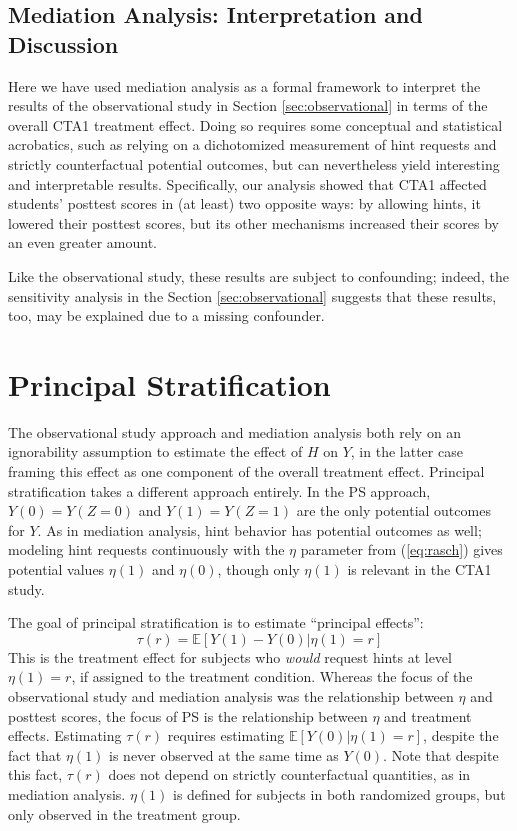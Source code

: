 \documentclass{article}
\newcommand{\EE}{\mathbb{E}}
\begin{document}
\subsection{Mediation Analysis: Interpretation and Discussion}
Here we have used mediation analysis as a formal framework to
interpret the results of the observational study in Section
\ref{sec:observational} in terms of the overall CTA1 treatment effect.
Doing so requires some conceptual and statistical acrobatics, such as
relying on a dichotomized measurement of hint requests and strictly
counterfactual potential outcomes, but can nevertheless yield
interesting and interpretable results.
Specifically, our analysis showed that CTA1 affected students'
posttest scores in (at least) two opposite ways: by allowing hints, it
lowered their posttest scores, but its other mechanisms increased
their scores by an even greater amount.

Like the observational study, these results are subject to
confounding; indeed, the sensitivity analysis in the Section
\ref{sec:observational} suggests that these results, too, may be
explained due to a missing confounder.



\section{Principal Stratification}\label{sec:principalStratification}
The observational study approach and mediation analysis both rely on
an ignorability assumption to estimate the effect of $H$ on $Y$, in
the latter case framing this effect as one component of the overall
treatment effect.
Principal stratification \citep[PS;][]{frangakis} takes a different approach entirely.
In the PS approach, $Y(0)=Y(Z=0)$ and $Y(1)=Y(Z=1)$ are the only potential
outcomes for $Y$.
As in mediation analysis, hint behavior has potential outcomes as
well; modeling hint requests continuously with the $\eta$ parameter
from (\ref{eq:rasch}) gives potential values $\eta(1)$ and $\eta(0)$,
though only $\eta(1)$ is relevant in the CTA1 study.

The goal of principal stratification is to estimate ``principal
effects'':
\begin{equation*}
\tau(r)=\EE[Y(1)-Y(0)|\eta(1)=r]
\end{equation*}
This is the treatment effect for subjects who \emph{would} request
hints at level $\eta(1)=r$, if assigned to the treatment condition.
Whereas the focus of the observational study and mediation
analysis was the relationship between $\eta$ and posttest scores, the
focus of PS is the relationship between $\eta$ and treatment effects.
Estimating $\tau(r)$ requires estimating $\EE[Y(0)|\eta(1)=r]$,
despite the fact that $\eta(1)$ is never observed at the same time as
$Y(0)$. Note that despite this fact, $\tau(r)$ does not depend on
strictly counterfactual quantities, as in mediation analysis.
$\eta(1)$ is defined for subjects in both randomized groups, but only
observed in the treatment group.
\end{document}
